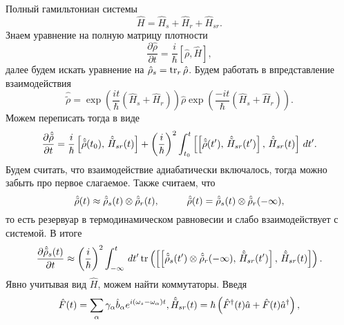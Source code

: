 Полный гамильтониан системы
\begin{equation*}
	\hat{H} = \hat{H}_s + \hat{H}_r + \hat{H}_{sr}.
\end{equation*}
Знаем уравнение на полную матрицу плотности
\begin{equation*}
	\frac{\partial \hat{\rho}}{\partial t}  = \frac{i}{\hbar}\left[\hat{\rho}, \hat{H}\right],
\end{equation*}
далее будем искать уравнение на $\hat{\rho}_s = \mathop{\mathrm{tr}}\nolimits_r \hat{\rho}$. Будем работать в впредставление взаимодействия
\begin{equation*}
	\hat{\tilde{\rho}} = \exp\left(\frac{it}{\hbar}\left(\hat{H}_s + \hat{H}_r\right)\right) \hat{\rho} \exp\left(
		\frac{-it}{\hbar}(\hat{H}_s + \hat{H}_r)
	\right).
\end{equation*}
Можем переписать тогда в виде
\begin{equation*}
	\frac{\partial \hat{\tilde{\rho}}}{\partial t} = \frac{i}{\hbar}\left[
		\hat{\tilde{\rho}}(t_0),\, \hat{\tilde{H}}_{sr}(t)
	\right] + \left(\frac{i}{\hbar}\right)^2 \int_{t_0}^{t} \left[
		\left[
			\hat{\tilde{\rho}}(t'),\, \hat{\tilde{H}}_{sr}(t')
		\right],\, 
		\hat{\tilde{H}}_{sr}(t)
	\right] \, d t'.
\end{equation*}
Будем считать, что взаимодействие адиабатически включалось, тогда можно забыть про первое слагаемое. Также считаем, что 
\begin{equation*}
	\hat{\tilde{\rho}}(t) \approx \hat{\tilde{\rho}}_s(t) \otimes \hat{\tilde{\rho}}_r(t),
	\hspace{10 mm} 
	\hat{\tilde{\rho}}(t) = \hat{\tilde{\rho}}_s(t) \otimes \hat{\tilde{\rho}}_r(-\infty),
\end{equation*}
то есть резервуар в термодинамическом равновесии и слабо взаимодействует с системой. В итоге
\begin{equation*}
	\frac{\partial \hat{\tilde{\rho}}_s(t)}{\partial t} \approx \left(\frac{i}{\hbar}\right)^2 \int_{-\infty}^{t} \, d t' \mathop{\mathrm{tr}}\nolimits \left(
		\left[
			\left[
				\hat{\tilde{\rho}}_s(t') \otimes \hat{\tilde{\rho}}_r(-\infty),\, \hat{\tilde{H}}_{sr}(t')
			\right],\, 
		\hat{\tilde{H}}_{sr}(t)
	\right] 
	\right).
\end{equation*}
Явно учитывая вид $\hat{H}$, можем найти коммутаторы. Введя
\begin{equation*}
	\hat{F}(t) = \sum_\alpha \gamma_\alpha \hat{b}_\alpha e^{i(\omega_s-\omega_\alpha)t},
	\hat{\tilde{H}}_{sr}(t) = \hbar\left(\hat{F}^{\dag}(t) \hat{a} + \hat{F}(t) \hat{a}^{\dag}\right),
\end{equation*}
